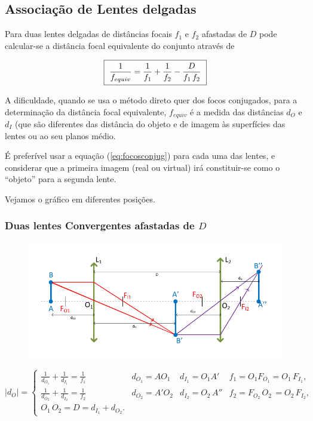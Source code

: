 \documentclass[a4paper,12pt]{article}      %
\begin{document}
\subsection{\sf Associação de Lentes delgadas}

Para duas lentes delgadas de distâncias focais $f_1$ e $f_2$ afastadas de $D$ pode calcular-se a distância focal equivalente do conjunto através de 

 \begin{equation}
	\label{eq:assoclentes}
    \fbox{
        $ \displaystyle
	\frac{1}{f_{equiv}} = \frac{1}{f_1} + \frac{1}{f_2} - \frac{D}{f_1 \,f_2} 
        $
    }
\end{equation}

A dificuldade, quando se usa o método direto quer dos focos conjugados, para a determinação da distância focal equivalente, ${f_{equiv}}$ é a medida das distâncias $d_O$ e $d_I$ 
(que são diferentes das distância do objeto e de imagem às superfícies das lentes ou ao seu planos médio.

É preferível usar a equação (\ref{eq:focosconjug}) para cada uma das lentes, e considerar que a primeira imagem (real ou virtual) irá constituir-se como o “objeto”  para a segunda lente. 

Vejamos o gráfico em diferentes posições.

\subsubsection{\sf Duas lentes Convergentes afastadas de $D$}
\begin{figure}	[!htb]  \centering 
	\includegraphics[width=\textwidth]{duplaConver_I}
\end{figure}

\begin{equation}
|d_O|  =  \left\{
\begin{array}{llll}
 \frac{1}{d_{O_1}} +  \frac{1}{d_{I_1}}   = \frac{1}{f_1}  & d_{O_1} = AO_1 & d_{I_1} = O_1A' & f_1 = O_1 F_{O_1} = O_1\,F_{I_1} ,\\
 \frac{1}{d_{O_2}} +  \frac{1}{d_{I_2}}   = \frac{1}{f_2}  & d_{O_2} = A'O_2 & d_{I_2} = O_2\,A'' & f_2 =  F_{O_2}\,O_2\, = O_2\,F_{I_2}, \\
O_1\,O_2 = D = d_{I_1} + d_{O_2}.
\end{array}  \right.
\label{eq:assoclentes_2}
\end{equation}
\end{document}
